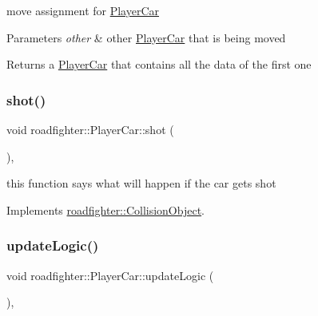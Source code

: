 move assignment for \hyperlink{classroadfighter_1_1PlayerCar}{Player\+Car} 
\begin{DoxyParams}{Parameters}
{\em other} & other \hyperlink{classroadfighter_1_1PlayerCar}{Player\+Car} that is being moved \\
\hline
\end{DoxyParams}
\begin{DoxyReturn}{Returns}
a \hyperlink{classroadfighter_1_1PlayerCar}{Player\+Car} that contains all the data of the first one 
\end{DoxyReturn}
\mbox{\label{classroadfighter_1_1PlayerCar_a592556a1c6326c9d9a70691f036eaafc}} 
\subsubsection{\texorpdfstring{shot()}{shot()}}
{\footnotesize\ttfamily void roadfighter\+::\+Player\+Car\+::shot (\begin{DoxyParamCaption}{ }\end{DoxyParamCaption})\hspace{0.3cm}{\ttfamily [override]}, {\ttfamily [virtual]}}

this function says what will happen if the car gets shot 

Implements \hyperlink{classroadfighter_1_1CollisionObject_a338a1071e6d5e25439e57c8673308dbb}{roadfighter\+::\+Collision\+Object}.

\mbox{\label{classroadfighter_1_1PlayerCar_a01480487ca7978a50a3c6609f1ebe6df}} 
\subsubsection{\texorpdfstring{update\+Logic()}{updateLogic()}}
{\footnotesize\ttfamily void roadfighter\+::\+Player\+Car\+::update\+Logic (\begin{DoxyParamCaption}{ }\end{DoxyParamCaption})\hspace{0.3cm}{\ttfamily [override]}, {\ttfamily [virtual]}}

